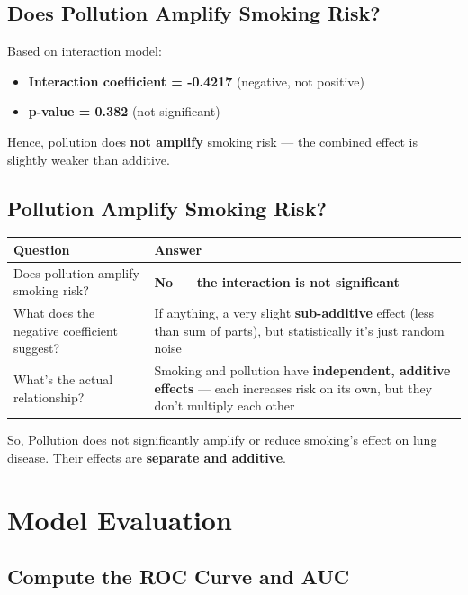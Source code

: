 \documentclass[a4paper,12pt]{article}
\begin{document}

\subsection{Does Pollution Amplify Smoking Risk?}
Based on interaction model:

\begin{itemize}
	\item \textbf{Interaction coefficient = -0.4217} (negative, not positive)
	\item \textbf{p-value = 0.382} (not significant)
\end{itemize}

Hence, pollution does \textbf{not amplify} smoking risk — the combined effect is slightly weaker than additive.
\subsection{Pollution Amplify Smoking Risk?}

\begin{center}
	\begin{tabular}{|l|l|}
		\hline
		\textbf{Question} & \textbf{Answer} \\
		\hline
		Does pollution amplify smoking risk? & \textbf{No — the interaction is not significant} \\
		\hline
		What does the negative coefficient suggest? & If anything, a very slight \textbf{sub-additive} effect (less than sum of parts), but statistically it's just random noise \\
		\hline
		What's the actual relationship? & Smoking and pollution have \textbf{independent, additive effects} — each increases risk on its own, but they don't multiply each other \\
		\hline
	\end{tabular}
\end{center}

\vspace{1em}

So, Pollution does not significantly amplify or reduce smoking's effect on lung disease. 
Their effects are \textbf{separate and additive}.
\section{Model Evaluation}

\subsection{Compute the ROC Curve and AUC}
\end{document}
